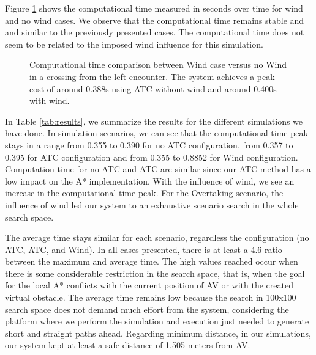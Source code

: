         Figure \ref{fig:plot_ov_w_vs_wind_CT} shows the computational time measured in seconds over time for wind and no wind cases. We observe that the computational time remains stable and and similar to the previously presented cases. The computational time does not seem to be related to the imposed wind influence for this simulation. 
        \begin{figure}[H]
            \centering
            
            \caption{Computational time comparison between Wind case versus no Wind in a crossing from the left encounter. The system achieves a peak cost of around 0.388s using \ac{ATC} without wind and around 0.400s with wind.}
            \label{fig:plot_ov_w_vs_wind_CT}
        \end{figure}
        
        
        In Table \ref{tab:results}, we summarize the results for the different simulations we have done. In simulation scenarios, we can see that the computational time peak stays in a range from 0.355 to 0.390 for no \ac{ATC} configuration, from 0.357 to 0.395 for \ac{ATC} configuration and from 0.355 to 0.8852 for Wind configuration. Computation time for no \ac{ATC} and \ac{ATC} are similar since our \ac{ATC} method has a low impact on the A* implementation. With the influence of wind, we see an increase in the computational time peak. For the Overtaking scenario, the influence of wind led our system to an exhaustive scenario search in the whole search space. 
        
        The average time stays similar for each scenario, regardless the configuration (no \ac{ATC}, \ac{ATC}, and Wind). In all cases presented, there is at least a 4.6 ratio between the maximum and average time. The high values reached occur when there is some considerable restriction in the search space, that is, when the goal for the local A* conflicts with the current position of \ac{AV} or with the created virtual obstacle. The average time remains low because the search in 100x100 search space does not demand much effort from the system, considering the platform where we perform the simulation and execution just needed to generate short and straight paths ahead. Regarding minimum distance, in our simulations, our system kept at least a safe distance of 1.505 meters from \ac{AV}. 
        
